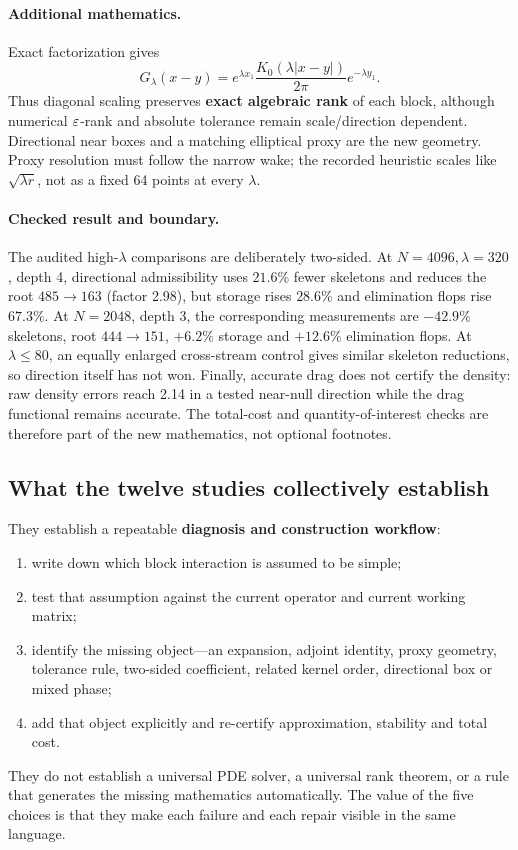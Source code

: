 \paragraph{Additional mathematics.} Exact factorization gives
\begin{equation}
 G_\lambda(x-y)=e^{\lambda x_1}\frac{K_0(\lambda|x-y|)}{2\pi}e^{-\lambda y_1}.
 \label{eq:oseen-scaling}
\end{equation}
Thus diagonal scaling preserves \textbf{exact algebraic rank} of each block, although numerical $\varepsilon$-rank and absolute tolerance remain scale/direction dependent. Directional near boxes and a matching elliptical proxy are the new geometry. Proxy resolution must follow the narrow wake; the recorded heuristic scales like $\sqrt{\lambda r}$, not as a fixed 64 points at every $\lambda$.

\paragraph{Checked result and boundary.} The audited high-$\lambda$ comparisons are deliberately two-sided. At $N=4096,\lambda=320$, depth 4, directional admissibility uses $21.6\%$ fewer skeletons and reduces the root $485\to163$ (factor 2.98), but storage rises $28.6\%$ and elimination flops rise $67.3\%$. At $N=2048$, depth 3, the corresponding measurements are $-42.9\%$ skeletons, root $444\to151$, $+6.2\%$ storage and $+12.6\%$ elimination flops. At $\lambda\le80$, an equally enlarged cross-stream control gives similar skeleton reductions, so direction itself has not won. Finally, accurate drag does not certify the density: raw density errors reach 2.14 in a tested near-null direction while the drag functional remains accurate. The total-cost and quantity-of-interest checks are therefore part of the new mathematics, not optional footnotes.

\subsection{What the twelve studies collectively establish}
They establish a repeatable \textbf{diagnosis and construction workflow}:
\begin{enumerate}
 \item write down which block interaction is assumed to be simple;
 \item test that assumption against the current operator and current working matrix;
 \item identify the missing object---an expansion, adjoint identity, proxy geometry, tolerance rule, two-sided coefficient, related kernel order, directional box or mixed phase;
 \item add that object explicitly and re-certify approximation, stability and total cost.
\end{enumerate}
They do not establish a universal PDE solver, a universal rank theorem, or a rule that generates the missing mathematics automatically. The value of the five choices is that they make each failure and each repair visible in the same language.
